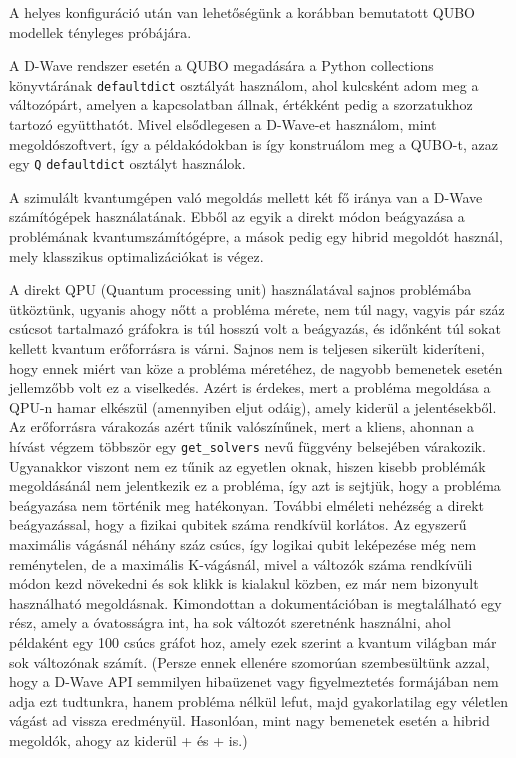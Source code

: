 A helyes konfiguráció után van lehetőségünk a korábban bemutatott QUBO modellek tényleges próbájára.

A D-Wave rendszer esetén a QUBO megadására a Python collections könyvtárának \verb+defaultdict+ osztályát használom, ahol kulcsként adom meg a változópárt, amelyen a kapcsolatban állnak, értékként pedig a szorzatukhoz tartozó együtthatót. Mivel elsődlegesen a D-Wave-et használom, mint megoldószoftvert, így a példakódokban is így konstruálom meg a QUBO-t, azaz egy \verb+Q+ \verb+defaultdict+ osztályt használok.

A szimulált kvantumgépen való megoldás mellett két fő iránya van a D-Wave számítógépek használatának. Ebből az egyik a direkt módon beágyazása a problémának kvantumszámítógépre, a mások pedig egy hibrid megoldót használ, mely klasszikus optimalizációkat is végez.


A direkt QPU (Quantum processing unit) használatával sajnos problémába ütköztünk, ugyanis ahogy nőtt a probléma mérete, nem túl nagy, vagyis pár száz csúcsot tartalmazó gráfokra is túl hosszú volt a beágyazás, és időnként túl sokat kellett kvantum erőforrásra is várni. Sajnos nem is teljesen sikerült kideríteni, hogy ennek miért van köze a probléma méretéhez, de nagyobb bemenetek esetén jellemzőbb volt ez a viselkedés. Azért is érdekes, mert a probléma megoldása a QPU-n hamar elkészül (amennyiben eljut odáig), amely kiderül a jelentésekből. Az erőforrásra várakozás azért tűnik valószínűnek, mert a kliens, ahonnan a hívást végzem többször egy \verb+get_solvers+ nevű függvény belsejében várakozik. Ugyanakkor viszont nem ez tűnik az egyetlen oknak, hiszen kisebb problémák megoldásánál nem jelentkezik ez a probléma, így azt is sejtjük, hogy a probléma beágyazása nem történik meg hatékonyan.
További elméleti nehézség a direkt beágyazással, hogy a fizikai qubitek száma rendkívül korlátos. Az egyszerű maximális vágásnál néhány száz csúcs, így logikai qubit leképezése még nem reménytelen, de a maximális K-vágásnál, mivel a változók száma rendkívüli módon kezd növekedni és sok klikk is kialakul közben, ez már nem bizonyult használható megoldásnak. Kimondottan a dokumentációban is megtalálható egy rész, amely a óvatosságra int, ha sok változót szeretnénk használni, ahol példaként egy 100 csúcs gráfot hoz, amely ezek szerint a kvantum világban már sok változónak számít. (Persze ennek ellenére szomorúan szembesültünk azzal, hogy a D-Wave API semmilyen hibaüzenet vagy figyelmeztetés formájában nem adja ezt tudtunkra, hanem probléma nélkül lefut, majd gyakorlatilag egy véletlen vágást ad vissza eredményül. Hasonlóan, mint nagy bemenetek esetén a hibrid megoldók, ahogy az kiderül \az+ és \az+ is.)

